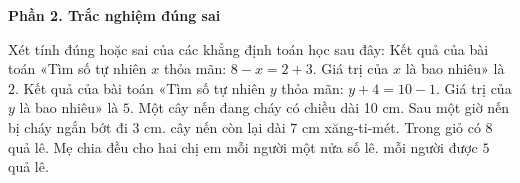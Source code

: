 \textbf{Phần 2. Trắc nghiệm đúng sai}

\begin{ex} %
Xét tính đúng hoặc sai của các khẳng định toán học sau đây:
\choiceTF
{Kết quả của bài toán «Tìm số tự nhiên $x$ thỏa mãn: $8 - x = 2 + 3$. Giá trị của $x$ là bao nhiêu» là $2$.}
{\True Kết quả của bài toán «Tìm số tự nhiên $y$ thỏa mãn: $y + 4 = 10 - 1$. Giá trị của $y$ là bao nhiêu» là $5$.}
{\True Một cây nến đang cháy có chiều dài 10 cm. Sau một giờ nến bị cháy ngắn bớt đi 3 cm. cây nến còn lại dài $7\text{ cm}$ xăng-ti-mét.}
{Trong giỏ có 8 quả lê. Mẹ chia đều cho hai chị em mỗi người một nửa số lê. mỗi người được $5$ quả lê.}
\end{ex}

